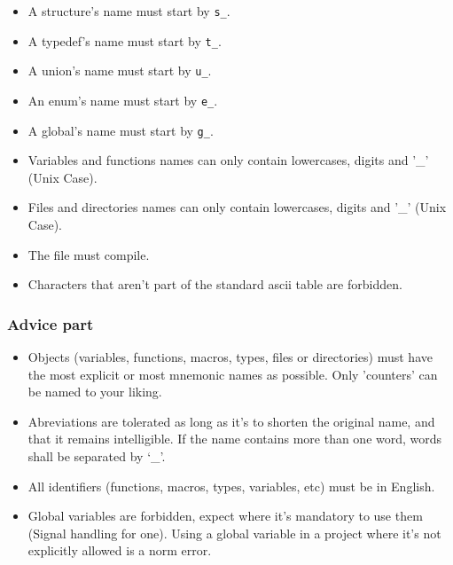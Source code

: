 \documentclass{42-en}
\begin{document}
            \begin{itemize}

                \item A structure's name must start by
                  \texttt{s\_}.

    			\item A typedef's name must start by
                  \texttt{t\_}.

    			\item A union's name must start by \texttt{u\_}.

    			\item An enum's name must start by \texttt{e\_}.

    			\item A global's name must start by
                  \texttt{g\_}.

    			\item Variables and functions names can
                  only contain lowercases, digits and
                  '\_' (Unix Case).

    			\item Files and directories names can
                  only contain lowercases, digits and
                  '\_' (Unix Case).

    			\item The file must compile.

			    \item Characters that aren't part of the standard
                  ascii table are forbidden.

            \end{itemize}

        \subsubsection{Advice part}

            \begin{itemize}

    			\item Objects (variables, functions, macros, types,
                  files or directories) must have the most
                  explicit or most mnemonic names as possible.
                  Only 'counters' can be named to your liking.

    			\item Abreviations are tolerated as long as it's
                  to shorten the original name, and that it
                  remains intelligible. If the name contains
                  more than one word, words shall be separated
                  by `\_'.

    			\item All identifiers (functions, macros, types,
                  variables, etc) must be in English.

                \item Global variables are forbidden, expect where it's
                  mandatory to use them (Signal handling for one). Using 
                  a global variable in a project where it's not explicitly 
                  allowed is a norm error.

            \end{itemize}
\end{document}
